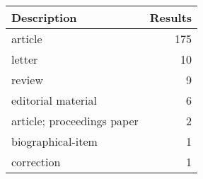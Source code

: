 
\begin{tabular}{lr}
\toprule
Description & Results\\
\midrule
article & 175\\
letter & 10\\
review & 9\\
editorial material & 6\\
article; proceedings paper & 2\\
\addlinespace
biographical-item & 1\\
correction & 1\\
\bottomrule
\end{tabular}